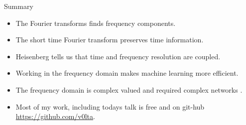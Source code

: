 \documentclass[xcolor=dvipsnames]{beamer}
\begin{document}
\begin{frame}{Summary}
\begin{itemize}
\item The Fourier transforms finds frequency components.
\item The short time Fourier transform preserves time information.
\item Heisenberg tells us that time and frequency resolution are coupled.
\item Working in the frequency domain makes machine learning more efficient.
\item The frequency domain is complex valued and required complex networks \cite{wolter2018complexgated}.
\item Most of my work, including todays talk is free and on git-hub \url{https://github.com/v0lta}.
\end{itemize}

\end{frame}




%   
%   
\end{document}
